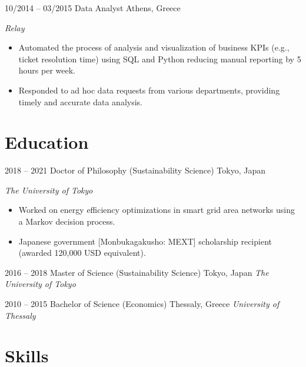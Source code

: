 \begin{entrylist}
\entry
{10/2014 -- 03/2015}
{Data Analyst}
{Athens, Greece}
{\emph{Relay}
\begin{itemize}
\item Automated the process of analysis and visualization of business KPIs (e.g., ticket resolution time) using SQL and Python reducing manual reporting by 5 hours per week.
\item Responded to ad hoc data requests from various departments, providing timely and accurate data analysis.
\end{itemize}
}
\end{entrylist}
\section{Education}
\begin{entrylist}
\entry
{2018 -- 2021}
{Doctor of Philosophy  (Sustainability Science)}
{Tokyo, Japan}
{\emph{The University of Tokyo}
\begin{itemize}
\item Worked on energy efficiency optimizations in smart grid area networks using a Markov decision process.
\item Japanese government [Monbukagakusho: MEXT] scholarship recipient (awarded 120,000 USD equivalent).
\end{itemize}
}
\end{entrylist}
\begin{entrylist}
\entry
{2016 -- 2018}
{Master of Science (Sustainability Science)}
{Tokyo, Japan}
{\emph{The University of Tokyo}}
\end{entrylist}

\begin{entrylist}
\entry
{2010 -- 2015}
{Bachelor of Science (Economics)}
{Thessaly, Greece}
{\emph{University of Thessaly}}
\end{entrylist}
\section{Skills}
\begin{skillslist}
\end{skillslist}
